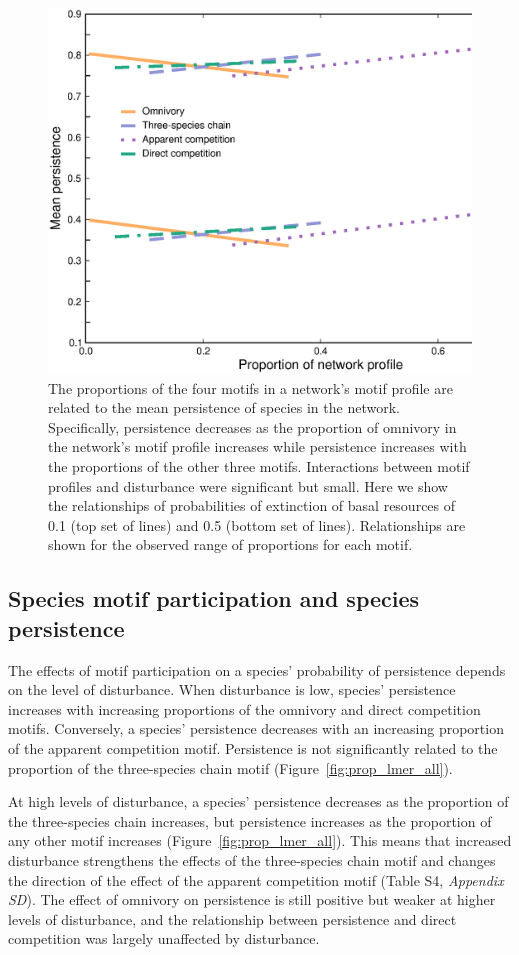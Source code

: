 \documentclass[12pt]{article}
\begin{document}
\begin{spacing}{2.0}
        \begin{figure}
            \centering
            \includegraphics[width=.5\textwidth]{figures/persistence_motif_profiles.eps}
            \caption{The proportions of the four motifs in a network's motif profile are related to the mean persistence of species in the network. Specifically, persistence decreases as the proportion of omnivory in the network's motif profile increases while persistence increases with the proportions of the other three motifs. Interactions between motif profiles and disturbance were significant but small. Here we show the relationships of probabilities of extinction of basal resources of 0.1 (top set of lines) and 0.5 (bottom set of lines). Relationships are shown for the observed range of proportions for each motif.}      
            \label{fig:motif_profile_persistence}
        \end{figure}    

    \subsection*{Species motif participation and species persistence} 
    
       The effects of motif participation on a species' probability of persistence depends on the level of disturbance. When disturbance is low, species' persistence increases with increasing proportions of the omnivory and direct competition motifs. Conversely, a species' persistence decreases with an increasing proportion of the apparent competition motif. Persistence is not significantly related to the proportion of the three-species chain motif (Figure~\ref{fig:prop_lmer_all}).
            
        At high levels of disturbance, a species' persistence decreases as the proportion of the three-species chain increases, but persistence increases as the proportion of any other motif increases (Figure~\ref{fig:prop_lmer_all}). This means that increased disturbance strengthens the effects of the three-species chain motif and changes the direction of the effect of the apparent competition motif  (Table S4, \emph{Appendix SD}). The effect of omnivory on persistence is still positive but weaker at higher levels of disturbance, and the relationship between persistence and direct competition was largely unaffected by disturbance.
    

\end{spacing}
\end{document}
